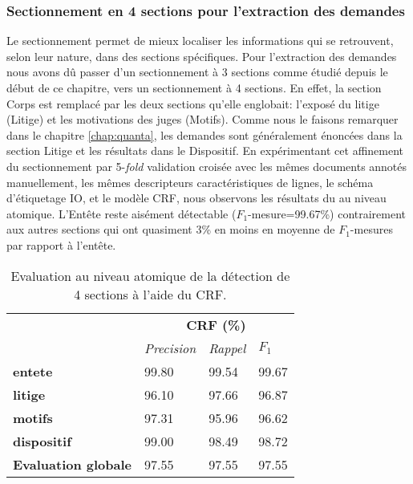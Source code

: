 \subsubsection{Sectionnement en 4 sections pour l'extraction des demandes}
Le sectionnement permet de mieux localiser les informations qui se retrouvent, selon leur nature, dans des sections spécifiques. Pour l'extraction des demandes nous avons dû passer d'un sectionnement à 3 sections comme étudié depuis le début de ce chapitre, vers un sectionnement à 4 sections. En effet, la section Corps est remplacé par les deux sections qu'elle englobait: l'exposé du litige (Litige) et les motivations des juges (Motifs). Comme nous le faisons remarquer dans le chapitre \ref{chap:quanta}, les demandes sont généralement énoncées dans la section Litige et les résultats dans le Dispositif. En expérimentant cet affinement du sectionnement par 5-\textit{fold} validation croisée avec les mêmes documents annotés manuellement, les mêmes descripteurs caractéristiques de lignes, le schéma d'étiquetage IO, et le modèle CRF, nous observons les résultats du  au niveau atomique. L'Entête reste aisément détectable ($F_1$-mesure=99.67\%) contrairement aux autres sections qui ont quasiment 3\% en moins en moyenne de $F_1$-mesures par rapport à l'entête.

\begin{table}[!htb]
	\centering
\begin{tabular}{|l|l|l|l|}
	\hline
	\multirow{2}{*}{}	&      \multicolumn{3}{|c|}{\textbf{CRF (\%)}}          \\ \cline{2-4} & \textit{Precision} & \textit{Rappel} & $F_1$ \\ \hline
	\textbf{entete} &   99.80 &	99.54 &	99.67      \\ 
	\textbf{litige}      &  96.10 &	97.66	& 96.87       \\ 
	\textbf{motifs}      &   97.31	&95.96	&96.62 \\
	\textbf{dispositif}    &   99.00&	98.49&	98.72  \\ \hline
	\textbf{Evaluation globale} &97.55	&97.55	&97.55       \\ \hline
\end{tabular}
\caption{Evaluation au niveau atomique de la détection de 4 sections à l'aide du CRF.} \label{tab:structuration:5folccvCRF-4sections}
\end{table}
